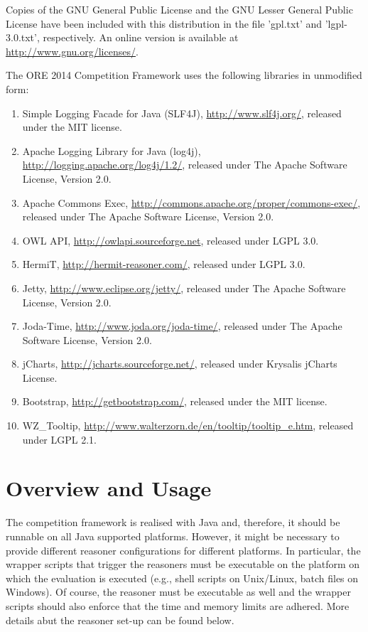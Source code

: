 \documentclass{article}
\begin{document}
Copies of the GNU General Public License and the GNU Lesser General Public 
License have been included with this distribution in the file 'gpl.txt' and 
'lgpl-3.0.txt', respectively. An online version is available at
\url{http://www.gnu.org/licenses/}.


The ORE 2014 Competition Framework uses the following libraries in unmodified form:
\begin{enumerate}
\item Simple Logging Facade for Java (SLF4J), \url{http://www.slf4j.org/}, released under the MIT license.
\item Apache Logging Library for Java (log4j), \url{http://logging.apache.org/log4j/1.2/}, released under The Apache Software License, Version 2.0.
\item Apache Commons Exec, \url{http://commons.apache.org/proper/commons-exec/}, released under The Apache Software License, Version 2.0.
\item OWL API, \url{http://owlapi.sourceforge.net}, released under LGPL 3.0.
\item HermiT, \url{http://hermit-reasoner.com/}, released under LGPL 3.0.
\item Jetty, \url{http://www.eclipse.org/jetty/}, released under The Apache Software License, Version 2.0.
\item Joda-Time, \url{http://www.joda.org/joda-time/}, released under The Apache Software License, Version 2.0.
\item jCharts, \url{http://jcharts.sourceforge.net/}, released under Krysalis jCharts License.
\item Bootstrap, \url{http://getbootstrap.com/}, released under the MIT license.
\item WZ\_Tooltip, \url{http://www.walterzorn.de/en/tooltip/tooltip_e.htm}, released under LGPL 2.1.
\end{enumerate}

\section{Overview and Usage}

The competition framework is realised with Java and, therefore, it should be runnable on all Java supported platforms.
However, it might be necessary to provide different reasoner configurations for different platforms. 
In particular, the wrapper scripts that trigger the reasoners must be executable on the platform on which the evaluation is executed (e.g., shell scripts on Unix/Linux, batch files on Windows).
Of course, the reasoner must be executable as well and the wrapper scripts should also enforce that the time and memory limits are adhered.
More details abut the reasoner set-up can be found below.
\end{document}
